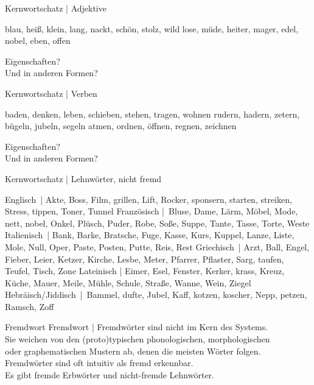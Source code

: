 \begin{frame}
  {Kernwortschatz | Adjektive}
  \onslide<+->
  \onslide<+->
  \begin{exe}
    \ex blau, heiß, klein, lang, nackt, schön, stolz, wild
    \onslide<+->
    \ex lose, müde, heiter, mager, edel, nobel, eben, offen
  \end{exe}
  \onslide<+->
  \Zeile
  Eigenschaften?\\
  \onslide<+->
  \Halbzeile
  Und in anderen Formen?
\end{frame}

\begin{frame}
  {Kernwortschatz | Verben}
  \onslide<+->
  \onslide<+->
  \begin{exe}
  \ex baden, denken, leben, schieben, stehen, tragen, wohnen
  \ex rudern, hadern, zetern, bügeln, jubeln, segeln
  \ex atmen, ordnen, öffnen, regnen, zeichnen
  \end{exe}
  \onslide<+->
  \Zeile
  Eigenschaften?\\
  \onslide<+->
  \Halbzeile
  Und in anderen Formen?
\end{frame}

\begin{frame}
  {Kernwortschatz | Lehnwörter, nicht fremd}
  \onslide<+->
  \onslide<+->
  \begin{exe}
    \ex \alert{Englisch} | Akte, Boss, Film, grillen, Lift, Rocker, sponsern, starten, streiken, Stress, tippen, Toner, Tunnel
    \onslide<+->
    \ex \alert{Französisch} | Bluse, Dame, Lärm, Möbel, Mode, nett, nobel, Onkel, Plüsch, Puder, Robe, Soße, Suppe, Tante, Tasse, Torte, Weste
    \onslide<+->
    \ex \alert{Italienisch} | Bank, Barke, Bratsche, Fuge, Kasse, Kurs, Kuppel, Lanze, Liste, Mole, Null, Oper, Paste, Posten, Putte, Reis, Rest
    \onslide<+->
    \ex \alert{Griechisch} | Arzt, Ball, Engel, Fieber, Leier, Ketzer, Kirche, Lesbe, Meter, Pfarrer, Pflaster, Sarg, taufen, Teufel, Tisch, Zone
    \onslide<+->
    \ex \alert{Lateinisch} | Eimer, Esel, Fenster, Kerker, krass, Kreuz, Küche, Mauer, Meile, Mühle, Schule, Straße, Wanne, Wein, Ziegel
    \onslide<+->
    \ex \alert{Hebräisch\slash Jiddisch} | Bammel, dufte, Jubel, Kaff, kotzen, koscher, Nepp, petzen, Ramsch, Zoff
  \end{exe}
\end{frame}

\begin{frame}
  {Fremdwort}
  \onslide<+->
  \onslide<+->
  \centering 
  \alert{Fremdwort} | Fremdwörter sind \alert{nicht im Kern des Systems}.\\
  Sie weichen von den (proto)typischen phonologischen, morphologischen\\
  oder graphematischen Mustern ab, denen die \alert{meisten Wörter} folgen.\\
  \onslide<+->
  \Zeile
  Fremdwörter sind oft intuitiv als \alert{fremd} erkennbar.\\
  \onslide<+->
  \Zeile
  Es gibt \alert{fremde Erbwörter} und \alert{nicht-fremde Lehnwörter}.
\end{frame}

